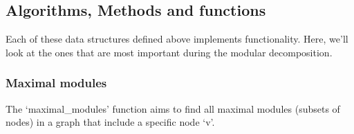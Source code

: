 \subsection{Algorithms, Methods and functions}\label{subsec:algoithms-methods-and-functions}

Each of these data structures defined above implements functionality.
Here, we'll look at the ones that are most important during the modular decomposition.

\subsubsection{Maximal modules}

The `maximal\_modules' function aims to find all maximal modules (subsets of nodes) in a graph that include a specific node `v'.

